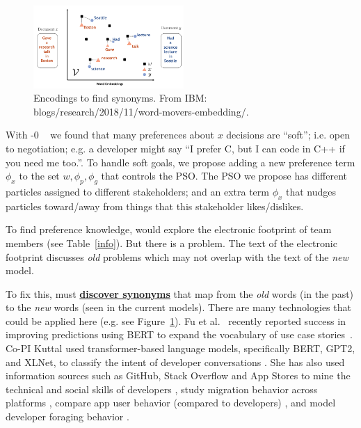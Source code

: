 \documentclass[twoside]{NSF}
\newcommand{\IT}{{\sffamily {\em \mbox{ADVICE}}}}
\newcommand{\ITS}[1]{\mbox{{\IT}-#1}}
\begin{document}
\begin{nsfdescription}
\begin{figure}
  \includegraphics[width=2.25in]{fig/word2vec.png}
\caption{Encodings to find synonyms.
From  IBM: blogs/research/2018/11/word-movers-embedding/.\vspace{1mm}}\label{aka} 
\end{figure}
With \ITS{0} ~\cite{lustosa21,lustosa22} we found that many preferences about $x$ decisions
are ``soft''; i.e. open to negotiation;
e.g. a developer might say ``I prefer     C, but I can code in C++   if you need me too.''. 
To handle  soft goals, we propose
adding a new preference
term $\phi_x$ to
the set $w,\phi_p,\phi_g$ that controls the
PSO.    The PSO we propose has
different particles assigned to different stakeholders;
and an extra term $\phi_x$ that nudges particles toward/away from things that this stakeholder likes/dislikes. 

 To find  preference knowledge, {\IT} would explore the electronic
footprint of   team members (see Table~\ref{info}). 
 But there is a problem. The text of the electronic footprint discusses {\em old} problems which may    not overlap with the text of the {\em new} model.

To fix this, {\IT} must \underline{\bf discover synonyms} that map from
the {\em old} words (in the past) to the {\em new} words (seen in the current models).
There are many technologies that could be applied here
(e.g. see Figure~\ref{aka}). Fu et al.~\cite{Fu22} recently reported success in improving predictions using BERT to expand the
vocabulary of use case stories~\cite{Burstein19}. Co-PI Kuttal used transformer-based language models, specifically 
 BERT, GPT2, and XLNet, to classify the intent of developer conversations \cite{RobeFSE2022, Hartposter2022, Alexposter2022}.
She has also used information sources such as GitHub, Stack Overflow and App Stores to mine the technical and social skills of developers \cite{sarma2016hiring, KuttalCWBS21}, study migration behavior across platforms \cite{abs-1810-13062}, compare app user behavior (compared to developers) \cite{Kuttal2020TugOP}, and model developer foraging behavior \cite{Abimgitposter2022,Zhou2018,RagavanPPHKSB17}. 




\end{nsfdescription}
\end{document}
